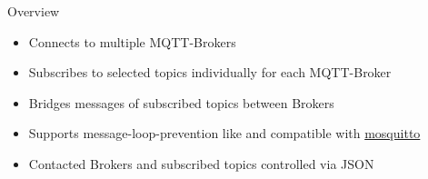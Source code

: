 \begin{frame}{Overview}
\begin{description}[MQTTIntegrator]
\begin{itemize}
        \end{itemize}
        \item [MQTTBridge]
        \begin{itemize}
            \item Connects to \alert{multiple} MQTT-\alert{Brokers}
            \item Subscribes to selected \alert{topics individually} for each MQTT-\alert{Broker}
            \item \alert{Bridges messages} of subscribed \alert{topics} between Brokers
            \item Supports \alert{message-loop-prevention} like and compatible with \href{https://mosquitto.org/}{\textcolor{fh-ooe-red}{mosquitto}}
            \item Contacted Brokers and subscribed topics controlled via \alert{JSON}
        \end{itemize}
    \end{description}
\end{frame}
